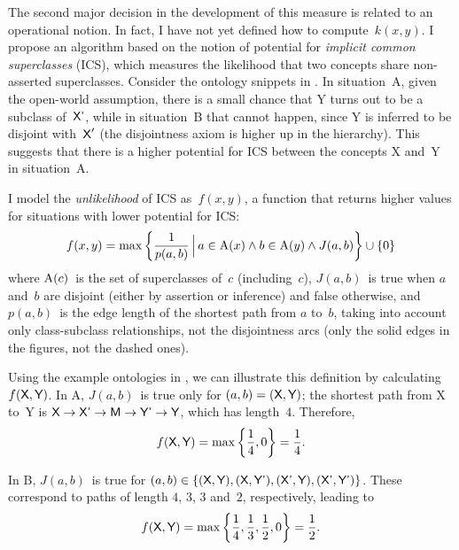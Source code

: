 The second major decision in the development of this measure is related to an operational notion. In fact, I have not yet defined how to compute~$k(x,y)$. I propose an algorithm based on the notion of potential for \emph{implicit common superclasses} (ICS), which measures the likelihood that two concepts share non-asserted superclasses. Consider the ontology snippets in . In situation~A, given the open-world assumption, there is a small chance that \term Y turns out to be a subclass of~$\protect\textsf{X'}$, while in situation~B that cannot happen, since \term Y is inferred to be disjoint with~$\protect\textsf X'$ (the disjointness axiom is higher up in the hierarchy). This suggests that there is a higher potential for ICS between the concepts \term X and~\term Y in situation~A.

I model the \emph{unlikelihood} of ICS as~$f(x, y)$, a function that returns higher values for situations with lower potential for ICS:
\begin{equation}
    f(x, y) =
    \max\left\{
        \frac{1}{p(a,b)} \,\Big|\, a\in\operatorname{A}(x) \wedge b\in\operatorname{A}(y) \wedge J(a,b)
    \right\}\cup\{0\}
\label{eq:strength}
\end{equation}
where $\operatorname{A}(c)$~is the set of superclasses of~$c$ (including~$c$), $J(a, b)$~is true when $a$ and~$b$ are disjoint (either by assertion or inference) and false otherwise, and $p(a, b)$~is the edge length of the shortest path from $a$ to~$b$, taking into account only class-subclass relationships, not the disjointness arcs (only the solid edges in the figures, not the dashed ones).

Using the example ontologies in , we can illustrate this definition by calculating~$f(\protect\textsf X, \protect\textsf Y)$. In A, $J(a,b)$~is true only for $(a,b)=(\protect\textsf X, \protect\textsf Y)$; the shortest path from \term X to~\term Y is $\protect\textsf X \rightarrow \protect\textsf{X'} \rightarrow \protect\textsf M \rightarrow \protect\textsf{Y'} \rightarrow \protect\textsf Y$, which has length~$4$. Therefore,
\begin{equation}
    f(\protect\textsf X, \protect\textsf Y)=\max\left\{\frac14,0\right\}=\frac14.
\end{equation}

In B, $J(a,b)$~is true for $(a,b)\in\{(\protect\textsf X, \protect\textsf Y), (\protect\textsf X, \protect\textsf{Y'}), (\protect\textsf{X'}, \protect\textsf Y), (\protect\textsf{X'}, \protect\textsf{Y'})\}$. These correspond to paths of length $4$, $3$, $3$ and~$2$, respectively, leading to
\begin{equation}
    f(\protect\textsf X, \protect\textsf Y) = \max\left\{\frac14, \frac13, \frac12, 0\right\}=\frac12.
\end{equation}

